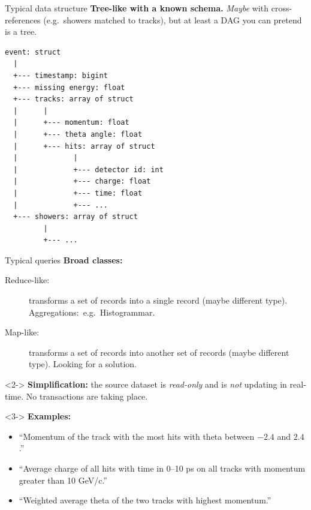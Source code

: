 \documentclass{beamer}
\begin{document}
\begin{frame}[fragile]{Typical data structure}
\vspace{0.25 cm}
\small
{\bf Tree-like with a known schema.} {\it Maybe} with cross-references (e.g.\ showers matched to tracks), but at least a DAG you can pretend is a tree.
\begin{verbatim}
event: struct
  |
  +--- timestamp: bigint
  +--- missing energy: float
  +--- tracks: array of struct
  |      |
  |      +--- momentum: float
  |      +--- theta angle: float
  |      +--- hits: array of struct
  |             |
  |             +--- detector id: int
  |             +--- charge: float
  |             +--- time: float
  |             +--- ...
  +--- showers: array of struct
         |
         +--- ...
\end{verbatim}
\end{frame}

\begin{frame}{Typical queries}
\vspace{0.25 cm}
{\bf Broad classes:}
\begin{description}
\item[Reduce-like:] transforms a set of records into a single record (maybe different type). \mbox{Aggregations: e.g.\ Histogrammar.\hspace{-1 cm}}
\item[Map-like:] transforms a set of records into another set of records (maybe different type). Looking for a solution.
\end{description}

\vspace{0.25 cm}
\begin{uncoverenv}<2->
{\bf Simplification:} the source dataset is {\it read-only} and is {\it not} updating in real-time. No transactions are taking place.
\end{uncoverenv}

\vspace{0.25 cm}
\begin{uncoverenv}<3->
{\bf Examples:}
\begin{itemize}
\item ``Momentum of the track with the most hits with theta between $-2.4$ and $2.4$.''
\item ``Average charge of all hits with time in 0--10 ps on all tracks with momentum greater than 10 GeV/c.''
\item ``Weighted average theta of the two tracks with highest momentum.''
\end{itemize}
\end{uncoverenv}
\end{frame}
\end{document}
